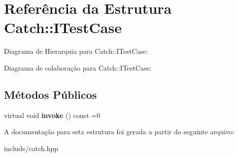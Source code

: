 \hypertarget{structCatch_1_1ITestCase}{}\section{Referência da Estrutura Catch\+:\+:I\+Test\+Case}
\label{structCatch_1_1ITestCase}


Diagrama de Hierarquia para Catch\+:\+:I\+Test\+Case\+:


Diagrama de colaboração para Catch\+:\+:I\+Test\+Case\+:
\subsection*{Métodos Públicos}
\begin{DoxyCompactItemize}
\item 
virtual void {\bfseries invoke} () const =0\hypertarget{structCatch_1_1ITestCase_a678825e62e7c17297621cfeb65588c34}{}\label{structCatch_1_1ITestCase_a678825e62e7c17297621cfeb65588c34}

\end{DoxyCompactItemize}


A documentação para esta estrutura foi gerada a partir do seguinte arquivo\+:\begin{DoxyCompactItemize}
\item 
include/catch.\+hpp\end{DoxyCompactItemize}
